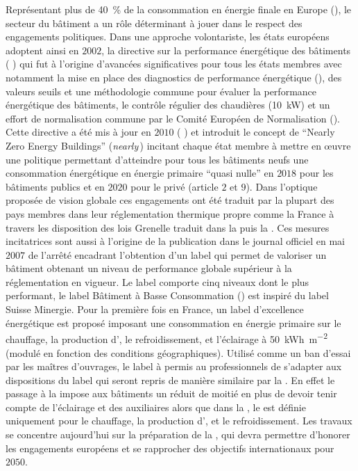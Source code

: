 Représentant plus de \SI{40}{\percent} de la consommation en énergie
finale en Europe (), le secteur du bâtiment a un rôle déterminant à
jouer dans le respect des engagements politiques. Dans une approche volontariste,
les états européens adoptent ainsi en $2002$, la directive sur la performance énergétique des bâtiments
( ) qui fut à l’origine
d’avancées significatives pour tous les états membres avec notamment la mise en place
des diagnostics de performance énergétique (), des valeurs seuils et une méthodologie commune
pour évaluer la performance énergétique des bâtiments, le contrôle régulier des chaudières (\SI{+10}{kW})
et un effort de normalisation commune par le Comité Européen de Normalisation ().
Cette directive a été mis à jour en $2010$ ( \textcite{EPBD2010}) et introduit le concept
de \enquote{Nearly Zero Energy Buildings} (\textit{nearly}\,) incitant chaque état membre à mettre
en œuvre une politique permettant d’atteindre pour tous les bâtiments neufs une consommation
énergétique en énergie primaire \enquote{quasi nulle} en $2018$ pour les bâtiments
publics et en $2020$ pour le privé (article $2$ et $9$).
Dans l’optique proposée de vision globale
ces engagements ont été traduit par la plupart des pays membres dans leur réglementation
thermique propre comme la France à travers les disposition des lois Grenelle traduit dans
la  puis la .
Ces mesures incitatrices sont aussi à l’origine de la publication dans le journal officiel
en mai $2007$ de l’arrêté encadrant l’obtention d’un label  qui permet de valoriser
un bâtiment obtenant un niveau de performance globale supérieur à la réglementation en
vigueur. Le label comporte cinq niveaux dont le plus performant, le label Bâtiment à
Basse Consommation (\href{https://www.effinergie.org/web/index.php/les-labels-effinergie/bbc-effinergie}{})
est inspiré du label Suisse Minergie. Pour la première fois en France, un
label d’excellence énergétique est proposé imposant une consommation en énergie primaire
sur le chauffage, la production d’, le refroidissement, et l’éclairage à
\SI{50}{kWh\per\metre\squared} (modulé en fonction des conditions géographiques).
Utilisé comme un ban d’essai par les maîtres d’ouvrages, le label à permis au professionnels
de s’adapter aux dispositions du label qui seront repris de manière similaire par la
. En effet le passage à la  impose aux bâtiments un  réduit
de moitié en plus de devoir tenir compte de l’éclairage et des auxiliaires alors que
dans la , le  est définie uniquement pour le chauffage, la production
d’, et le refroidissement.
Les travaux se concentre aujourd’hui sur la préparation de la , qui devra
permettre d’honorer les engagements européens et se rapprocher des objectifs internationaux
pour $2050$.


